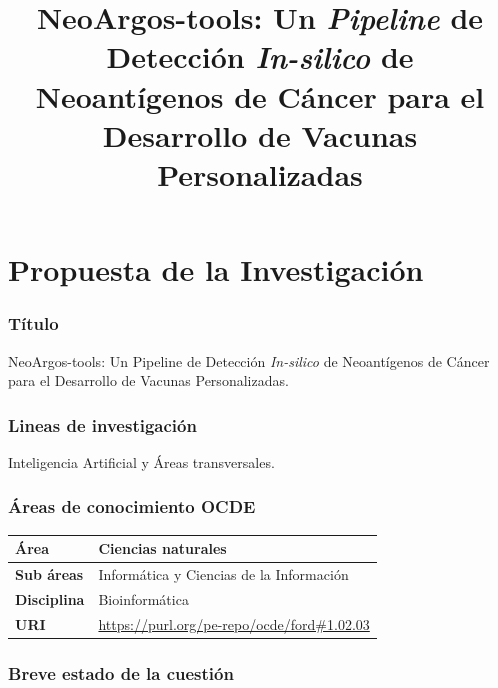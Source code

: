 \documentclass[a4paper,11pt]{article}
\title{NeoArgos-tools: Un \textit{Pipeline} de Detección \textit{In-silico} de Neoantígenos de Cáncer para el Desarrollo de Vacunas Personalizadas}
\author{}
\date{}
\begin{document}
	

	
	
	
	
	
	
	

\part*{Propuesta de la Investigación}

\section{Título}
NeoArgos-tools: Un Pipeline de Detección \textit{In-silico} de Neoantígenos de Cáncer para el Desarrollo de Vacunas Personalizadas.

\section{Lineas de investigación}
Inteligencia Artificial y Áreas transversales.

\section{Áreas de conocimiento OCDE}

	\begin{table}[h]
	\centering
		\setlength{\tabcolsep}{0.5em} %
		{\renewcommand{\arraystretch}{1}%
        {\small
		\begin{tabular}{|p{3cm}|p{10cm}|} \hline
			\textbf{Área} & Ciencias naturales \\ \hline
			\textbf{Sub áreas} &  Informática y Ciencias de la Información \\ \hline
			\textbf{Disciplina} & Bioinformática \\ \hline
			\textbf{URI} &  \href{https://purl.org/pe-repo/ocde/ford\#1.02.03}{https://purl.org/pe-repo/ocde/ford\#1.02.03} \\ \hline
		\end{tabular}
        }
        }
	\end{table}

	\section{Breve estado de la cuestión}
	
\end{document}
